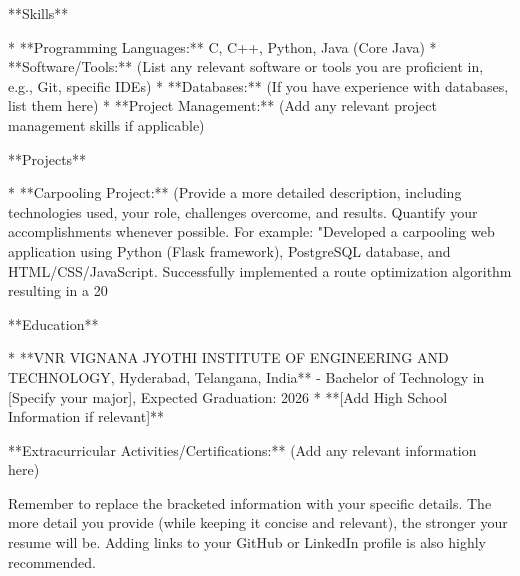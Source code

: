 \documentclass[a4paper, 12pt]{article}
\begin{document}
**Skills**

* **Programming Languages:** C, C++, Python, Java (Core Java)
* **Software/Tools:** (List any relevant software or tools you are proficient in, e.g., Git, specific IDEs)
* **Databases:** (If you have experience with databases, list them here)
* **Project Management:** (Add any relevant project management skills if applicable)


**Projects**

* **Carpooling Project:** (Provide a more detailed description, including technologies used, your role, challenges overcome, and results. Quantify your accomplishments whenever possible. For example:  "Developed a carpooling web application using Python (Flask framework), PostgreSQL database, and HTML/CSS/JavaScript.  Successfully implemented a route optimization algorithm resulting in a 20%


**Education**

* **VNR VIGNANA JYOTHI INSTITUTE OF ENGINEERING AND TECHNOLOGY, Hyderabad, Telangana, India** - Bachelor of Technology in [Specify your major], Expected Graduation: 2026
* **[Add High School Information if relevant]**


**Extracurricular Activities/Certifications:** (Add any relevant information here)


Remember to replace the bracketed information with your specific details.  The more detail you provide (while keeping it concise and relevant), the stronger your resume will be.  Adding links to your GitHub or LinkedIn profile is also highly recommended.
 
   
    
\end{document}
